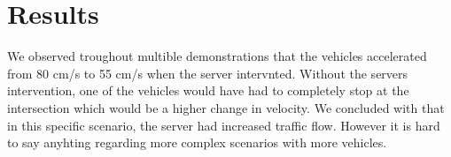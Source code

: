 \section{Results}

We observed troughout multible demonstrations that the vehicles accelerated from 80 cm/s to 55 cm/s when the server intervnted. Without the servers intervention, one of the vehicles would have had to completely stop at the intersection which would be a higher change in velocity. We concluded with that in this specific scenario, the server had increased traffic flow. However it is hard to say anyhting regarding more complex scenarios with more vehicles.


